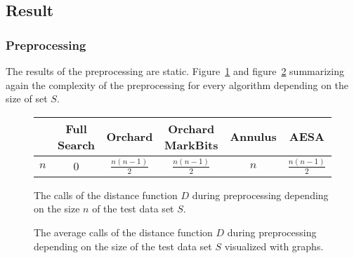 \documentclass[runningheads,a4paper]{llncs}
\begin{document}
\subsection{Result}

\subsubsection{Preprocessing}

The results of the preprocessing are static. Figure~\ref{fig:preprocessing:tabular} and
figure~\ref{fig:preprocessing:graph} summarizing again the complexity of the preprocessing for every algorithm
depending on the size of set $S$.

\begin{figure}
	\begin{center}
		\begin{tabular}{| l | c | c | c | c | c |}
			\hline
		  	& Full Search & Orchard & Orchard MarkBits & Annulus & AESA \\ \hline
		  	$n$ & 0 & $\frac{n(n-1)}{2}$ & $\frac{n(n-1)}{2}$ & $n$ & $\frac{n(n-1)}{2}$ \\ \hline
		\end{tabular}
	\end{center}
	\caption{The calls of the distance function $D$ during preprocessing depending on the size $n$ of the test data set
		$S$.}
	\label{fig:preprocessing:tabular}
\end{figure}

\begin{figure}
	\begin{center}
	\end{center}
	\caption{The average calls of the distance function $D$ during preprocessing depending on the size of the test data
		set $S$ visualized with graphs.}
	\label{fig:preprocessing:graph}
\end{figure}
\end{document}

